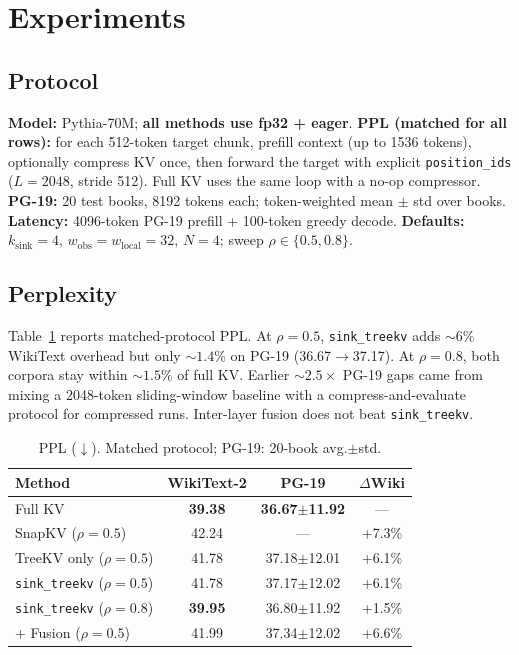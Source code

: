 \documentclass{article}
\begin{document}
\section{Experiments}

\subsection{Protocol}
\textbf{Model:} Pythia-70M; \textbf{all methods use fp32 + eager}.
\textbf{PPL (matched for all rows):} for each 512-token target chunk, prefill context (up to 1536 tokens), optionally compress KV once, then forward the target with explicit \texttt{position\_ids} ($L{=}2048$, stride 512).
Full KV uses the same loop with a no-op compressor.
\textbf{PG-19:} 20 test books, 8192 tokens each; token-weighted mean $\pm$ std over books.
\textbf{Latency:} 4096-token PG-19 prefill + 100-token greedy decode.
\textbf{Defaults:} $k_{\mathrm{sink}}{=}4$, $w_{\mathrm{obs}}{=}w_{\mathrm{local}}{=}32$, $N{=}4$; sweep $\rho\in\{0.5,0.8\}$.

\subsection{Perplexity}
Table~\ref{tab:ppl} reports matched-protocol PPL.
At $\rho{=}0.5$, \texttt{sink\_treekv} adds ${\sim}6\%$ WikiText overhead but only ${\sim}1.4\%$ on PG-19 (36.67$\rightarrow$37.17).
At $\rho{=}0.8$, both corpora stay within ${\sim}1.5\%$ of full KV.
Earlier ${\sim}2.5\times$ PG-19 gaps came from mixing a 2048-token sliding-window baseline with a compress-and-evaluate protocol for compressed runs.
Inter-layer fusion does not beat \texttt{sink\_treekv}.

\begin{table}[t]
  \centering
  \caption{PPL ($\downarrow$). Matched protocol; PG-19: 20-book avg.$\pm$std.}
  \label{tab:ppl}
  \small
  \setlength{\tabcolsep}{6pt}
  \begin{tabular}{@{}lccc@{}}
    \toprule
    Method & WikiText-2 & PG-19 & $\Delta$Wiki \\
    \midrule
    Full KV & \textbf{39.38} & \textbf{36.67$\pm$11.92} & --- \\
    SnapKV ($\rho{=}0.5$) & 42.24 & --- & +7.3\% \\
    TreeKV only ($\rho{=}0.5$) & 41.78 & 37.18$\pm$12.01 & +6.1\% \\
    \texttt{sink\_treekv} ($\rho{=}0.5$) & 41.78 & 37.17$\pm$12.02 & +6.1\% \\
    \texttt{sink\_treekv} ($\rho{=}0.8$) & \textbf{39.95} & 36.80$\pm$11.92 & +1.5\% \\
    + Fusion ($\rho{=}0.5$) & 41.99 & 37.34$\pm$12.02 & +6.6\% \\
    \bottomrule
  \end{tabular}
\end{table}
\end{document}
